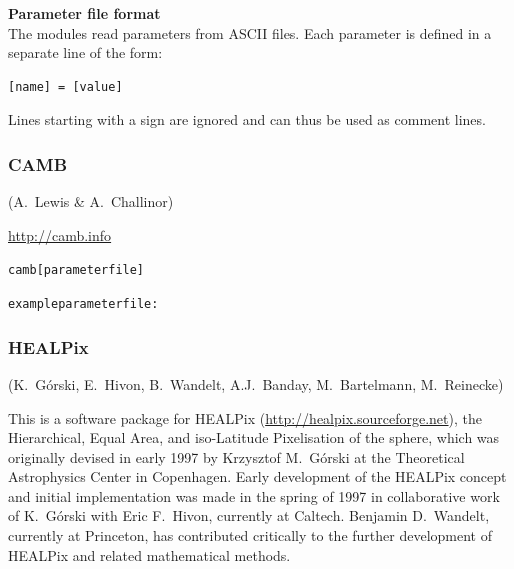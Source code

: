 \vspace{0.3cm}

\textbf{Parameter file format}\\
The modules read parameters from ASCII files. Each parameter is
defined in a separate line of the form:
\begin{verbatim}
[name] = [value]
\end{verbatim}
Lines starting with a \tw{\#} sign are ignored and can thus be
used as comment lines.

\subsubsection{CAMB}

(A.~Lewis \& A.~Challinor)

\href{http://camb.info}{http://camb.info}

\begin{alltt}
camb [parameter file]

example parameter file:


\end{alltt}


\subsubsection{HEALPix}

(K.~G\'orski, E.~Hivon, B.~Wandelt, A.J.~Banday, M.~Bartelmann, M.~Reinecke)

This is a software package for HEALPix
(\href{http://healpix.sourceforge.net}{http://healpix.sourceforge.net}),
the Hierarchical, Equal Area, and
iso-Latitude Pixelisation of the sphere, which was originally devised
in early 1997 by Krzysztof M.~G\'orski at the Theoretical Astrophysics
Center in Copenhagen. Early development of the HEALPix concept and
initial implementation was made in the spring of 1997 in collaborative
work of K.~G\'orski with Eric F.~Hivon, currently at Caltech. Benjamin
D.~Wandelt, currently at Princeton, has contributed critically to the
further development of HEALPix and related mathematical methods.

